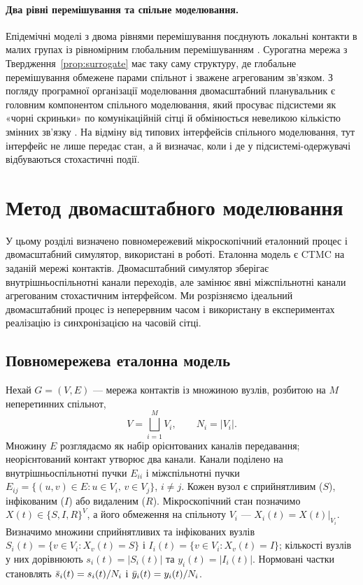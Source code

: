\paragraph{Два рівні перемішування та спільне моделювання.}
Епідемічні моделі з двома рівнями перемішування поєднують локальні контакти в малих групах із рівномірним глобальним перемішуванням \citep{ball1997}. Сурогатна мережа з Твердження~\ref{prop:surrogate} має таку саму структуру, де глобальне перемішування обмежене парами спільнот і зважене агрегованим зв'язком. З погляду програмної організації моделювання двомасштабний планувальник є головним компонентом спільного моделювання, який просуває підсистеми як «чорні скриньки» по комунікаційній сітці й обмінюється невеликою кількістю змінних зв'язку \citep{gomes2018cosim}. На відміну від типових інтерфейсів спільного моделювання, тут інтерфейс не лише передає стан, а й визначає, коли і де у підсистемі-одержувачі відбуваються стохастичні події.

\clearpage
\section{Метод двомасштабного моделювання}
\label{sec:method}

У цьому розділі визначено повномережевий мікроскопічний еталонний процес і двомасштабний симулятор, використані в роботі. Еталонна модель є CTMC на заданій мережі контактів. Двомасштабний симулятор зберігає внутрішньоспільнотні канали переходів, але замінює явні міжспільнотні канали агрегованим стохастичним інтерфейсом. Ми розрізняємо ідеальний двомасштабний процес із неперервним часом і використану в експериментах реалізацію із синхронізацією на часовій сітці.

\subsection{Повномережева еталонна модель}
\label{sec:reference}

Нехай $G=(V,E)$ --- мережа контактів із множиною вузлів, розбитою на $M$ неперетинних спільнот,
\begin{equation}
\label{eq:partition}
V=\bigsqcup_{i=1}^{M}V_i,\qquad N_i=|V_i|.
\end{equation}
Множину $E$ розглядаємо як набір орієнтованих каналів передавання; неорієнтований контакт утворює два канали. Канали поділено на внутрішньоспільнотні пучки $E_{ii}$ і міжспільнотні пучки $E_{ij}=\{(u,v)\in E:u\in V_i,\,v\in V_j\}$, $i\neq j$. Кожен вузол є сприйнятливим ($S$), інфікованим ($I$) або видаленим ($R$). Мікроскопічний стан позначимо $X(t)\in\{S,I,R\}^{V}$, а його обмеження на спільноту $V_i$ --- $X_i(t)=X(t)|_{V_i}$. Визначимо множини сприйнятливих та інфікованих вузлів $S_i(t)=\{v\in V_i:X_v(t)=S\}$ і $I_i(t)=\{v\in V_i:X_v(t)=I\}$; кількості вузлів у них дорівнюють $s_i(t)=|S_i(t)|$ та $y_i(t)=|I_i(t)|$. Нормовані частки становлять $\bar{s}_i(t)=s_i(t)/N_i$ і $\bar{y}_i(t)=y_i(t)/N_i$.

